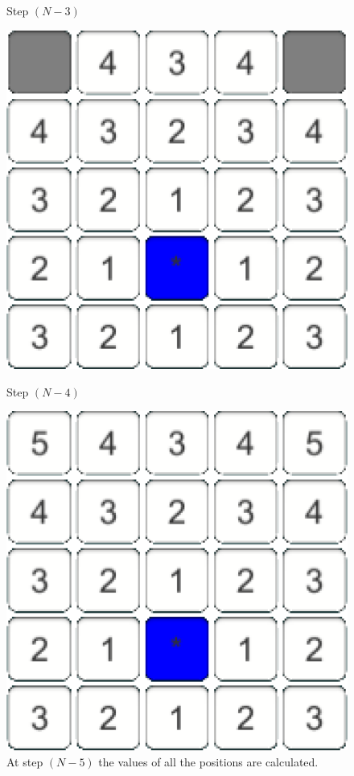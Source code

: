 \documentclass[conference]{IEEEtran}
\begin{document}
\begin{figure}[h]
\begin{minipage}[t]{0.3\linewidth}
\caption{Step $(N-3)$}
\end{minipage}
\hfill
\begin{minipage}[t]{0.3\linewidth}
\centering
\includegraphics[width=1\textwidth]{images/ValueFunction/05.png}
\caption{Step $(N-4)$}
\end{minipage}
\hfill
\begin{minipage}[t]{0.3\linewidth}
\centering
\includegraphics[width=1\textwidth]{images/ValueFunction/06.png}
\caption{At step $(N-5)$ the values of all the positions are calculated.}
\end{minipage}
\end{figure}
\end{document}
